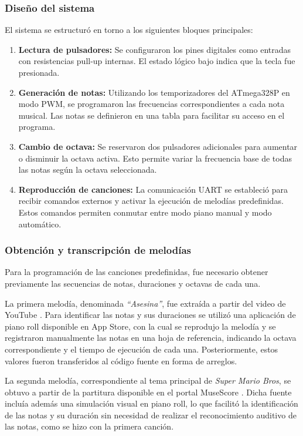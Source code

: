 \subsubsection{Diseño del sistema}
El sistema se estructuró en torno a los siguientes bloques principales:
\begin{enumerate}
    \item \textbf{Lectura de pulsadores:} Se configuraron los pines digitales como entradas con resistencias pull-up internas. El estado lógico bajo indica que la tecla fue presionada.
    \item \textbf{Generación de notas:} Utilizando los temporizadores del ATmega328P en modo PWM, se programaron las frecuencias correspondientes a cada nota musical. Las notas se definieron en una tabla para facilitar su acceso en el programa.
    \item \textbf{Cambio de octava:} Se reservaron dos pulsadores adicionales para aumentar o disminuir la octava activa. Esto permite variar la frecuencia base de todas las notas según la octava seleccionada.
    \item \textbf{Reproducción de canciones:} La comunicación UART se estableció para recibir comandos externos y activar la ejecución de melodías predefinidas. Estos comandos permiten conmutar entre modo piano manual y modo automático.
\end{enumerate}

\subsubsection{Obtención y transcripción de melodías}

Para la programación de las canciones predefinidas, fue necesario obtener previamente las secuencias de notas, duraciones y octavas de cada una. 

La primera melodía, denominada \textit{“Asesina”}, fue extraída a partir del video de YouTube \cite{youtube_asesina}. Para identificar las notas y sus duraciones se utilizó una aplicación de piano roll disponible en App Store, con la cual se reprodujo la melodía y se registraron manualmente las notas en una hoja de referencia, indicando la octava correspondiente y el tiempo de ejecución de cada una. Posteriormente, estos valores fueron transferidos al código fuente en forma de arreglos.

La segunda melodía, correspondiente al tema principal de \textit{Super Mario Bros}, se obtuvo a partir de la partitura disponible en el portal MuseScore \cite{musescore_mario}. Dicha fuente incluía además una simulación visual en piano roll, lo que facilitó la identificación de las notas y su duración sin necesidad de realizar el reconocimiento auditivo de las notas, como se hizo con la primera canción. 

